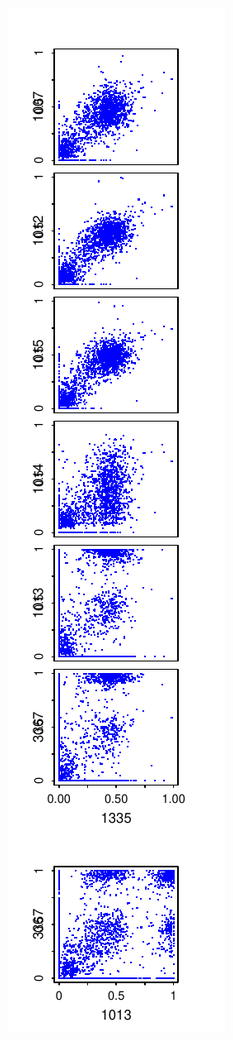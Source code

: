 \documentclass{article}\usepackage[]{graphicx}\usepackage[]{color}
\begin{document}
\includegraphics{Fig1-mscat-figs/6+1julie1T.pdf}%
\end{document}

